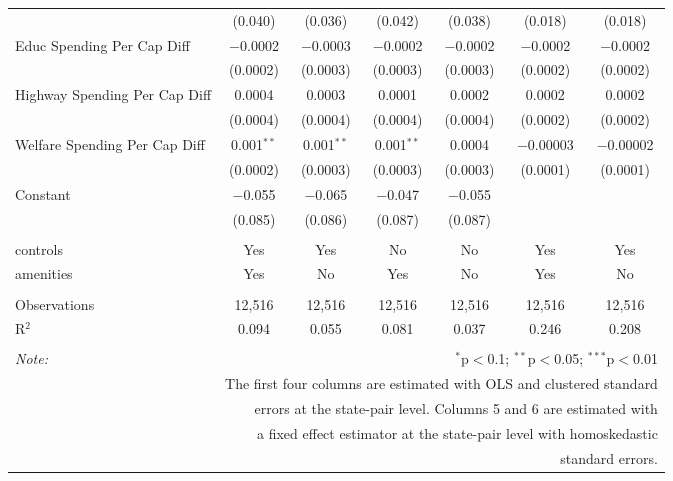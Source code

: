 \begin{table}[!htbp]
\begin{tabular}{@{\extracolsep{5pt}}lcccccc}
  & (0.040) & (0.036) & (0.042) & (0.038) & (0.018) & (0.018) \\ 
  Educ Spending Per Cap Diff & $-$0.0002 & $-$0.0003 & $-$0.0002 & $-$0.0002 & $-$0.0002 & $-$0.0002 \\ 
  & (0.0002) & (0.0003) & (0.0003) & (0.0003) & (0.0002) & (0.0002) \\ 
  Highway Spending Per Cap Diff & 0.0004 & 0.0003 & 0.0001 & 0.0002 & 0.0002 & 0.0002 \\ 
  & (0.0004) & (0.0004) & (0.0004) & (0.0004) & (0.0002) & (0.0002) \\ 
  Welfare Spending Per Cap Diff & 0.001$^{**}$ & 0.001$^{**}$ & 0.001$^{**}$ & 0.0004 & $-$0.00003 & $-$0.00002 \\ 
  & (0.0002) & (0.0003) & (0.0003) & (0.0003) & (0.0001) & (0.0001) \\ 
  Constant & $-$0.055 & $-$0.065 & $-$0.047 & $-$0.055 &  &  \\ 
  & (0.085) & (0.086) & (0.087) & (0.087) &  &  \\ 
 \hline \\[-1.8ex] 
controls & Yes & Yes & No & No & Yes & Yes \\ 
amenities & Yes & No & Yes & No & Yes & No \\ 
\hline \\[-1.8ex] 
Observations & 12,516 & 12,516 & 12,516 & 12,516 & 12,516 & 12,516 \\ 
R$^{2}$ & 0.094 & 0.055 & 0.081 & 0.037 & 0.246 & 0.208 \\ 
\hline 
\hline \\[-1.8ex] 
\textit{Note:}  & \multicolumn{6}{r}{$^{*}$p$<$0.1; $^{**}$p$<$0.05; $^{***}$p$<$0.01} \\ 
 & \multicolumn{6}{r}{The first four columns are estimated with OLS and clustered standard} \\ 
 & \multicolumn{6}{r}{ errors at the state-pair level. Columns 5 and 6 are estimated with} \\ 
 & \multicolumn{6}{r}{a fixed effect estimator at the state-pair level with homoskedastic} \\ 
 & \multicolumn{6}{r}{standard errors.} \\ 
\end{tabular} 
\end{table} 
